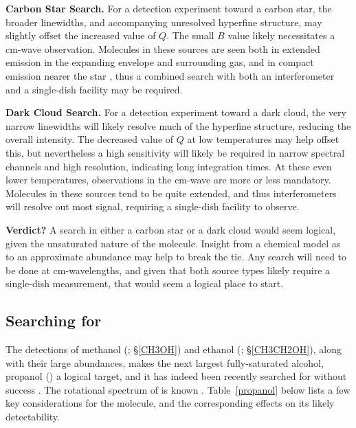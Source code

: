 \documentclass[twocolumn]{aastex631}
\begin{document}
\textbf{Carbon Star Search.}  For a detection experiment toward a carbon star, the broader linewidths, and accompanying unresolved hyperfine structure, may slightly offset the increased value of $Q$.  The small $B$ value likely necessitates a cm-wave observation.  Molecules in these sources are seen both in extended emission in the expanding envelope and surrounding gas, and in compact emission nearer the star \citep{Cernicharo:2013cc}, thus a combined search with both an interferometer and a single-dish facility may be required.  

\textbf{Dark Cloud Search.}  For a detection experiment toward a dark cloud, the very narrow linewidths will likely resolve much of the hyperfine structure, reducing the overall intensity.  The decreased value of $Q$ at low temperatures may help offset this, but nevertheless a high sensitivity will likely be required in narrow spectral channels and high resolution, indicating long integration times.  At these even lower temperatures, observations in the cm-wave are more or less mandatory.  Molecules in these sources tend to be quite extended, and thus interferometers will resolve out most signal, requiring a single-dish facility to observe.

\textbf{Verdict?}  A search in either a carbon star or a dark cloud would seem logical, given the unsaturated nature of the molecule.  Insight from a chemical model as to an approximate abundance may help to break the tie.  Any search will need to be done at cm-wavelengths, and given that both source types likely require a single-dish measurement, that would seem a logical place to start.

\subsection{Searching for }

The detections of methanol (; \S\ref{CH3OH}) and ethanol (; \S\ref{CH3CH2OH}), along with their  large abundances, makes the next largest fully-saturated alcohol, propanol () a logical target, and it has indeed been recently searched for without success \citep{Muller:2016kd}.  The rotational spectrum of  is known \citep{Kisiel:2010gw}. Table~\ref{propanol} below lists a few key considerations for the molecule, and the corresponding effects on its likely detectability.
\end{document}
